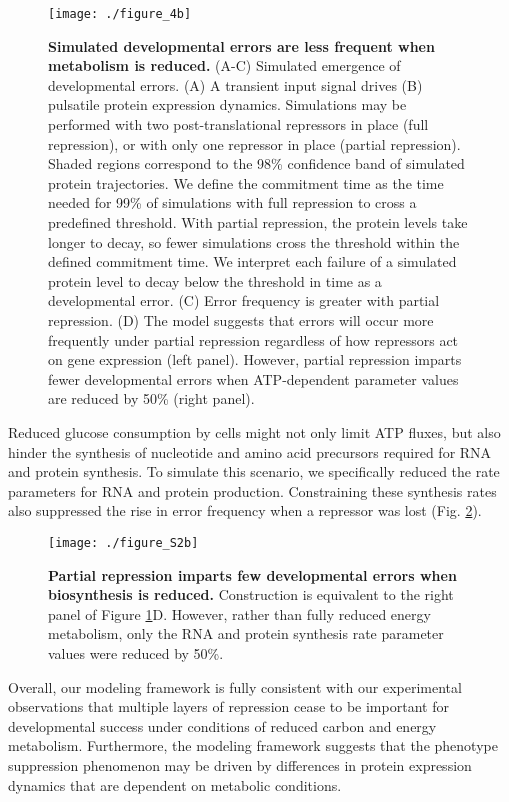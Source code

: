 \begin{figure}[h!]
\centering
\texttt{[image: ./figure\_4b]}
\caption[Simulated errors are less frequent when metabolism is reduced.]{\textbf{Simulated developmental errors are less frequent when metabolism is reduced.} (A-C) Simulated emergence of developmental errors. (A) A transient input signal drives (B) pulsatile protein expression dynamics. Simulations may be performed with two post-translational repressors in place (full repression), or with only one repressor in place (partial repression). Shaded regions correspond to the 98\% confidence band of simulated protein trajectories. We define the commitment time as the time needed for 99\% of simulations with full repression to cross a predefined threshold. With partial repression, the protein levels take longer to decay, so fewer simulations cross the threshold within the defined commitment time. We interpret each failure of a simulated protein level to decay below the threshold in time as a developmental error. (C) Error frequency is greater with partial repression. (D) The model suggests that errors will occur more frequently under partial repression regardless of how repressors act on gene expression (left panel). However, partial repression imparts fewer developmental errors when ATP-dependent parameter values are reduced by 50\% (right panel).}
\label{fig:metabolism:fig4b}
\end{figure}

Reduced glucose consumption by cells might not only limit ATP fluxes, but also hinder the synthesis of nucleotide and amino acid precursors required for RNA and protein synthesis. To simulate this scenario, we specifically reduced the rate parameters for RNA and protein production. Constraining these synthesis rates also suppressed the rise in error frequency when a repressor was lost (Fig. \ref{fig:metabolism:figS2b}).

\begin{figure}[h!]
\centering
\texttt{[image: ./figure\_S2b]}
\caption[Reduced biosynthesis diminishes the frequency of developmental errors.]{\textbf{Partial repression imparts few developmental errors when biosynthesis is reduced.} Construction is equivalent to the right panel of Figure \ref{fig:metabolism:fig4b}D. However, rather than fully reduced energy metabolism, only the RNA and protein synthesis rate parameter values were reduced by 50\%.}
\label{fig:metabolism:figS2b}
\end{figure}

Overall, our modeling framework is fully consistent with our experimental observations that multiple layers of repression cease to be important for developmental success under conditions of reduced carbon and energy metabolism. Furthermore, the modeling framework suggests that the phenotype suppression phenomenon may be driven by differences in protein expression dynamics that are dependent on metabolic conditions.

